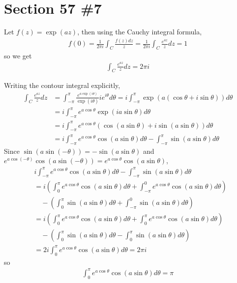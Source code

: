 \documentclass{scrartcl}
\begin{document}
\section{Section 57 \#7}
Let \(f(z) = \exp(az)\), then using the Cauchy integral formula,
\begin{align*}
  f(0) = \frac{1}{2\pi i} \int_C \frac{f(z) dz}{z} = \frac{1}{2\pi i} \int_C \frac{e^{az}}{z} dz = 1
\end{align*}
so we get
\begin{align*}
  \int_C \frac{e^{az}}{z} dz = 2\pi i
\end{align*}

Writing the contour integral explicitly,
\begin{align*}
  \int_C \frac{e^{az}}{z} dz &= \int^\pi_{-\pi} \frac{e^{a\exp(i\theta)}}{\exp(i\theta)} ie^{i\theta} d\theta = i \int^\pi_{-\pi} \exp(a(\cos \theta + i \sin \theta)) d\theta \\
                             &= i \int^\pi_{-\pi} e^{a\cos \theta} \exp(i a \sin \theta) d\theta \\
                             &= i \int^\pi_{-\pi} e^{a\cos \theta} (\cos(a \sin \theta) + i\sin (a \sin \theta)) d\theta \\
                             &= i \int^\pi_{-\pi} e^{a\cos \theta} \cos (a \sin \theta) d\theta - \int^\pi_{-\pi} \sin (a \sin \theta) d\theta
\end{align*}
Since \(\sin(a \sin (-\theta)) = -\sin (a \sin \theta)\) and \(e^{a \cos (-\theta)} \cos (a \sin (-\theta)) = e^{a \cos \theta} \cos (a \sin \theta)\),
\begin{align*}
  &i \int^\pi_{-\pi} e^{a\cos \theta} \cos (a \sin \theta) d\theta - \int^\pi_{-\pi} \sin (a \sin \theta) d\theta \\
  &= i \left( \int^\pi_0 e^{a\cos \theta} \cos (a \sin \theta) d\theta + \int^0_{-\pi} e^{a\cos \theta} \cos (a \sin \theta) d\theta \right) \\
  &\quad - \left( \int^\pi_0 \sin (a \sin \theta) d\theta + \int^0_{-\pi} \sin (a \sin \theta) d\theta \right) \\
  &= i \left( \int^\pi_0 e^{a\cos \theta} \cos (a \sin \theta) d\theta + \int^\pi_0 e^{a\cos \theta} \cos (a \sin \theta) d\theta \right) \\
  &\quad - \left( \int^\pi_0 \sin (a \sin \theta) d\theta - \int^\pi_0 \sin (a \sin \theta) d\theta \right) \\
  &= 2i \int^\pi_0 e^{a\cos \theta} \cos (a \sin \theta) d\theta = 2\pi i
\end{align*}
so
\begin{align*}
  \int^\pi_0 e^{a \cos \theta} \cos (a \sin \theta) d\theta = \pi
\end{align*}
\end{document}
